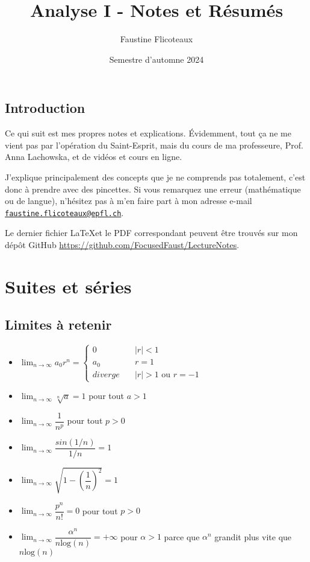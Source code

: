 \documentclass[10pt,a4paper]{book}
\title{Analyse I - Notes et Résumés}
\author{Faustine Flicoteaux}
\date{Semestre d'automne 2024}
\begin{document}
\maketitle
\tableofcontents
\newpage


\section*{Introduction}
Ce qui suit est mes propres notes et explications. Évidemment, tout ça ne me vient pas par l'opération du Saint-Esprit, mais du cours de ma professeure, Prof. Anna Lachowska, et de vidéos et cours en ligne.\par 
J'explique principalement des concepts que je ne comprends pas totalement, c'est donc à prendre avec des pincettes. Si vous remarquez une erreur (mathématique ou de langue), n'hésitez pas à m'en faire part à mon adresse e-mail \texttt{\href{mailto:faustine.flicoteaux@epfl.ch}{faustine.flicoteaux@epfl.ch}}.\par 
Le dernier fichier \LaTeX et le PDF correspondant peuvent être trouvés sur mon dépôt GitHub \url{https://github.com/FocusedFaust/LectureNotes}.

\chapter{Suites et séries}
\section{Limites à retenir}
\begin{itemize}
\item $\lim_{n\to\infty} a_0r^n = \left\{
        \begin{array}{ll}
            0 & \quad |r| < 1\\
            a_0 & \quad r = 1\\
            diverge & \quad |r| > 1 \text{ ou } r = -1
        \end{array}\right.$
\item $\lim_{n\to\infty} \sqrt[n]{a} = 1$ pour tout $a > 1$
\item $\lim_{n\to\infty} \dfrac{1}{n^p}$ pour tout $p > 0$
\item $\lim_{n\to\infty} \dfrac{sin(1/n)}{1/n} = 1$
\item $\lim_{n\to\infty} \sqrt{1-(\dfrac{1}{n})^2} = 1$
\item $\lim_{n\to\infty} \dfrac{p^n}{n!} = 0$ pour tout $p > 0$
\item $\lim_{n\to\infty} \dfrac{\alpha^n}{n\text{log}(n)} = +\infty$ pour $\alpha>1$ parce que $\alpha^n$ grandit plus vite que $n\text{log}(n)$
\end{itemize}
\end{document}
